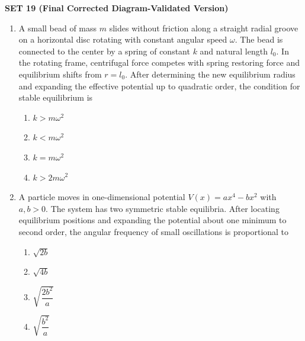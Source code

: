 \documentclass[12pt]{article}
\begin{document}
\begin{center}
{\Large \textbf{SET 19 (Final Corrected Diagram-Validated Version)}}
\end{center}

\begin{enumerate}[leftmargin=*]

\item A small bead of mass $m$ slides without friction along a straight radial groove on a horizontal disc rotating with constant angular speed $\omega$. The bead is connected to the center by a spring of constant $k$ and natural length $l_0$. In the rotating frame, centrifugal force competes with spring restoring force and equilibrium shifts from $r=l_0$. After determining the new equilibrium radius and expanding the effective potential up to quadratic order, the condition for stable equilibrium is

\begin{center}
\end{center}

\begin{enumerate}
\item $k > m\omega^2$
\item $k < m\omega^2$
\item $k = m\omega^2$
\item $k > 2m\omega^2$
\end{enumerate}

\item A particle moves in one-dimensional potential $V(x)=ax^4-bx^2$ with $a,b>0$. The system has two symmetric stable equilibria. After locating equilibrium positions and expanding the potential about one minimum to second order, the angular frequency of small oscillations is proportional to

\begin{enumerate}
\item $\sqrt{2b}$
\item $\sqrt{4b}$
\item $\sqrt{\dfrac{2b^2}{a}}$
\item $\sqrt{\dfrac{b^2}{a}}$
\end{enumerate}


\end{enumerate}
\end{document}
